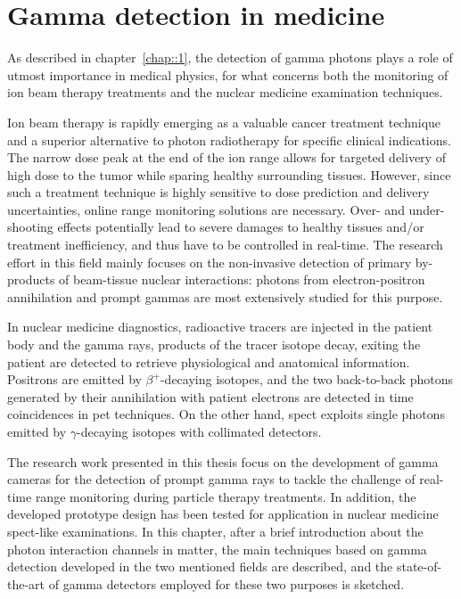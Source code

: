 \chapter{Gamma detection in medicine}\label{chap::2}

\vfill

\minitoc

\newpage

\glsresetall

As described in chapter~\ref{chap::1}, the detection of gamma photons plays a role of utmost importance in medical physics, for what concerns both the monitoring of ion beam therapy treatments and the nuclear medicine examination techniques. 

Ion beam therapy is rapidly emerging as a valuable cancer treatment technique and a superior alternative to photon radiotherapy for specific clinical indications. The narrow dose peak at the end of the ion range allows for targeted delivery of high dose to the tumor while sparing healthy surrounding tissues. However, since such a treatment technique is highly sensitive to dose prediction and delivery uncertainties, online range monitoring solutions are necessary. Over- and under-shooting effects potentially lead to severe damages to healthy tissues and/or treatment inefficiency, and thus have to be controlled in real-time. The research effort in this field mainly focuses on the non-invasive detection of primary by-products of beam-tissue nuclear interactions: photons from electron-positron annihilation and prompt gammas are most extensively studied for this purpose. 

In nuclear medicine diagnostics, radioactive tracers are injected in the patient body and the gamma rays, products of the tracer isotope decay, exiting the patient are detected to retrieve physiological and anatomical information. Positrons are emitted by $\beta^+$-decaying isotopes, and the two back-to-back photons generated by their annihilation with patient electrons are detected in time coincidences in \gls{pet} techniques. On the other hand, \gls{spect} exploits single photons emitted by $\gamma$-decaying isotopes with collimated detectors.

The research work presented in this thesis focus on the development of gamma cameras for the detection of prompt gamma rays to tackle the challenge of real-time range monitoring during particle therapy treatments. In addition, the developed prototype design has been tested for application in nuclear medicine \gls{spect}-like examinations. 
In this chapter, after a brief introduction about the photon interaction channels in matter, the main techniques based on gamma detection developed in the two mentioned fields are described, and the state-of-the-art of gamma detectors employed for these two purposes is sketched.

